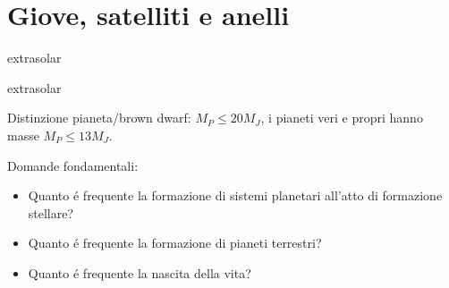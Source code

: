 \section{Giove, satelliti e anelli}

\begin{frame}{extrasolar}


\end{frame}

\begin{wordonframe}{extrasolar}

Distinzione pianeta/brown dwarf: $M_P\leq20M_J$, i pianeti veri e propri hanno masse $M_P\leq13M_J$.

Domande fondamentali:
\begin{itemize}
    \item Quanto \'e frequente la formazione di sistemi planetari all'atto di formazione stellare?
    \item Quanto \'e frequente la formazione di pianeti terrestri?
    \item Quanto \'e frequente la nascita della vita?
\end{itemize}

\end{wordonframe}
